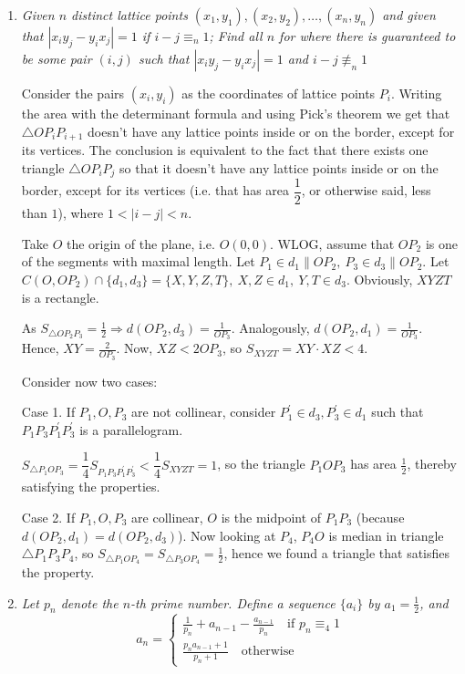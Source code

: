 \documentclass{article}
\begin{document}
\begin{enumerate}
\medskip
\item %
{\itshape Given $n$ distinct lattice points $(x_1,y_1),(x_2,y_2),\ldots,(x_n,y_n)$ and given that $|x_iy_{j}-y_ix_{j}| = 1$ if $i-j\equiv_n 1$;
Find all $n$ for where there is guaranteed to be some pair $(i,j)$ such that $|x_iy_{j}-y_ix_{j}| = 1$ and $i-j\not\equiv_n 1$
}

Consider the pairs $(x_i,y_i)$ as the coordinates of lattice points $P_i$. Writing the area with the determinant formula and using Pick's theorem we get that $\triangle{OP_iP_{i+1}}$ doesn't have any lattice points inside or on the border, except for its vertices.
The conclusion is equivalent to the fact that there exists one triangle $\triangle{OP_iP_j}$ so that it doesn't have any lattice points inside or on the border, except for its vertices (i.e. that has area $\dfrac{1}{2}$, or otherwise said, less than $1$), where $1<|i-j|<n$.

Take $O$ the origin of the plane, i.e. $O(0,0)$. WLOG, assume that $OP_2$ is one of the segments with maximal length. Let $P_1\in d_1\parallel OP_2,\ P_3\in d_3\parallel OP_2$. Let $C(O,OP_2)\cap \{ d_1,d_3\}=\{X,Y,Z,T\},\ X,Z\in d_1,\ Y,T\in d_3$. Obviously, $XYZT$ is a rectangle.

As $S_{\triangle{OP_2P_3}}=\frac{1}{2}\Rightarrow d(OP_2,d_3)=\frac{1}{OP_3}$. Analogously, $ d(OP_2,d_1)=\frac{1}{OP_3}$. Hence, $XY=\frac{2}{OP_3}$. Now, $XZ<2OP_3$, so $S_{XYZT}=XY\cdot XZ<4$.

Consider now two cases:

Case 1. If $P_1,O,P_3$ are not collinear, consider $P_1^\prime \in d_3, P_3^\prime \in d_1$ such that $P_1P_3P_1^\prime P_3^\prime$ is a parallelogram.

$S_{\triangle{P_1OP_3}}=\dfrac{1}{4}S_{P_1P_3P_1^\prime P_3^\prime}<\dfrac{1}{4}S_{XYZT}=1$, so the triangle $P_1OP_3$ has area $\frac{1}{2}$, thereby satisfying the properties.

Case 2. If $P_1,O,P_3$ are collinear, $O$ is the midpoint of $P_1P_3$ (because $d(OP_2,d_1)=d(OP_2,d_3)$).
Now looking at $P_4$, $P_4O$ is median in triangle $\triangle{P_1P_3P_4}$, so $S_{\triangle{P_1OP_4}}=S_{\triangle{P_3OP_4}}=\frac{1}{2}$, hence we found a triangle that satisfies the property.

\medskip
\item %
{\itshape Let $p_n$ denote the $n$-th prime number. Define a sequence $\{a_i\}$ by $a_1 = \frac{1}{2}$, and
$$
a_n = 
\begin{cases}
	\frac{1}{p_n} + a_{n - 1} - \frac{a_{n - 1}}{p_n} \quad \text{if } p_n \equiv _4 1 \\
	\frac{p_na_{n - 1} + 1}{p_n + 1} \quad \text{otherwise}
\end{cases}
$$

}
\end{enumerate}
\end{document}

